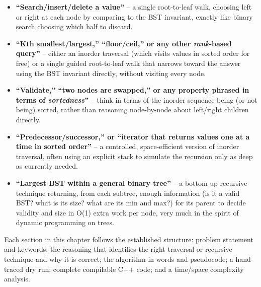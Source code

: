 \begin{patternbox}
\begin{itemize}
  \item \textbf{``Search/insert/delete a value''} -- a single
        root-to-leaf walk, choosing left or right at each node by
        comparing to the BST invariant, exactly like binary search
        choosing which half to discard.
  \item \textbf{``Kth smallest/largest,'' ``floor/ceil,'' or any other
        \emph{rank}-based query''} -- either an inorder traversal (which
        visits values in sorted order for free) or a single guided
        root-to-leaf walk that narrows toward the answer using the BST
        invariant directly, without visiting every node.
  \item \textbf{``Validate,'' ``two nodes are swapped,'' or any property
        phrased in terms of \emph{sortedness}''} -- think in terms of the
        inorder sequence being (or not being) sorted, rather than
        reasoning node-by-node about left/right children directly.
  \item \textbf{``Predecessor/successor,'' or ``iterator that returns
        values one at a time in sorted order''} -- a controlled,
        space-efficient version of inorder traversal, often using an
        explicit stack to simulate the recursion only as deep as
        currently needed.
  \item \textbf{``Largest BST within a general binary tree''} -- a
        bottom-up recursive technique returning, from each subtree,
        enough information (is it a valid BST? what is its size? what
        are its min and max?) for its parent to decide validity and size
        in O(1) extra work per node, very much in the spirit of dynamic
        programming on trees.
\end{itemize}
\end{patternbox}

Each section in this chapter follows the established structure: problem
statement and keywords; the reasoning that identifies the right traversal
or recursive technique and why it is correct; the algorithm in words and
pseudocode; a hand-traced dry run; complete compilable C++ code; and a
time/space complexity analysis.

\newpage















